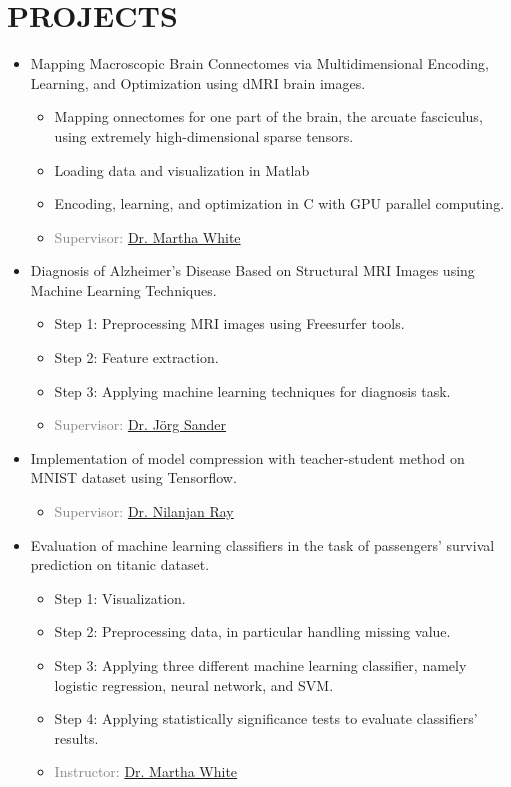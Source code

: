 \section{PROJECTS}
\vspace{0.3em}
	\begin{itemize}

		\item Mapping Macroscopic Brain Connectomes via
		Multidimensional Encoding, Learning, and Optimization using dMRI brain images.
		\begin{itemize}
			\item Mapping onnectomes for one
			part of the brain, the arcuate fasciculus, using extremely high-dimensional sparse tensors.
			\item Loading data and visualization in Matlab
			\item Encoding, learning, and optimization in C with GPU parallel computing.
			\item \textcolor{gray}{Supervisor: \href{http://webdocs.cs.ualberta.ca/~whitem/}{Dr. Martha White}}
		\end{itemize}

		\item Diagnosis of Alzheimer's Disease Based on Structural MRI Images using Machine Learning Techniques.
		\begin{itemize}
			\item Step 1: Preprocessing MRI images using Freesurfer tools.
			\item Step 2: Feature extraction.
			\item Step 3: Applying machine learning techniques for diagnosis task.
			\item \textcolor{gray}{Supervisor: \href{http://webdocs.cs.ualberta.ca/~joerg/}{Dr. Jörg Sander}}
			
		\end{itemize}
	
		\item Implementation of model compression with teacher-student method on MNIST dataset using Tensorflow.
		\begin{itemize}
			\item \textcolor{gray}{Supervisor: \href{https://webdocs.cs.ualberta.ca/~nray1/}{Dr. Nilanjan Ray}}
		\end{itemize}
		
		\item Evaluation of machine learning classifiers in the task of passengers' survival prediction on titanic dataset.
		\begin{itemize}
			\item Step 1: Visualization.
			\item Step 2: Preprocessing data, in particular handling missing value.
			\item Step 3: Applying three different machine learning classifier, namely logistic regression, neural network, and SVM.
			\item Step 4: Applying statistically significance tests to evaluate classifiers' results.
			\item \textcolor{gray}{Instructor: \href{http://webdocs.cs.ualberta.ca/~whitem/}{Dr. Martha White}}
		\end{itemize}
	

\end{itemize}
